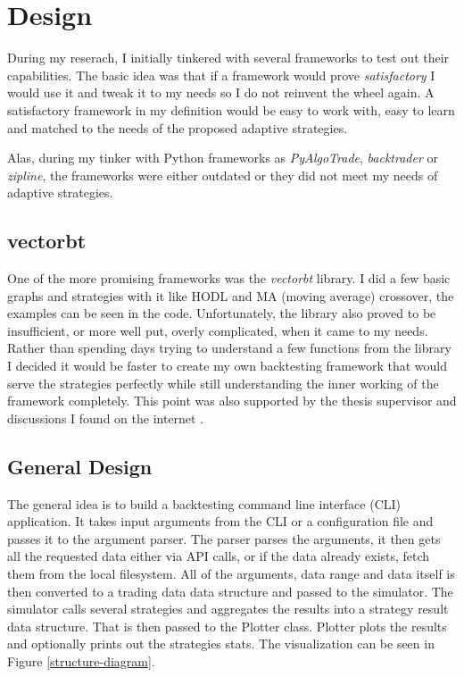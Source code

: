 \section{Design}
During my reserach, I initially tinkered with several frameworks to test out their capabilities. The basic idea was that if a framework would prove \emph{satisfactory} I would use it and tweak it to my needs so I do not reinvent the wheel again. A satisfactory framework in my definition would be easy to work with, easy to learn and matched to the needs of the proposed adaptive strategies.

Alas, during my tinker with Python frameworks as \emph{PyAlgoTrade}, \emph{backtrader} or \emph{zipline}, the frameworks were either outdated or they did not meet my needs of adaptive strategies.

\subsection*{vectorbt}
One of the more promising frameworks was the \emph{vectorbt} library. I did a few basic graphs and strategies with it like HODL and MA (moving average) crossover, the examples can be seen in the code. Unfortunately, the library also proved to be insufficient, or more well put, overly complicated, when it came to my needs. Rather than spending days trying to understand a few functions from the library I decided it would be faster to create my own backtesting framework that would serve the strategies perfectly while still understanding the inner working of the framework completely. This point was also supported by the thesis supervisor and discussions I found on the internet \cite{reddit:custom-backtester}.

\subsection*{General Design}
The general idea is to build a backtesting command line interface (CLI) application. It takes input arguments from the CLI or a configuration file and passes it to the argument parser. The parser parses the arguments, it then gets all the requested data either via API calls, or if the data already exists, fetch them from the local filesystem. All of the arguments, data range and data itself is then converted to a trading data data structure and passed to the simulator. The simulator calls several strategies and aggregates the results into a strategy result data structure. That is then passed to the Plotter class. Plotter plots the results and optionally prints out the strategies stats. The visualization can be seen in Figure \ref{structure-diagram}.


